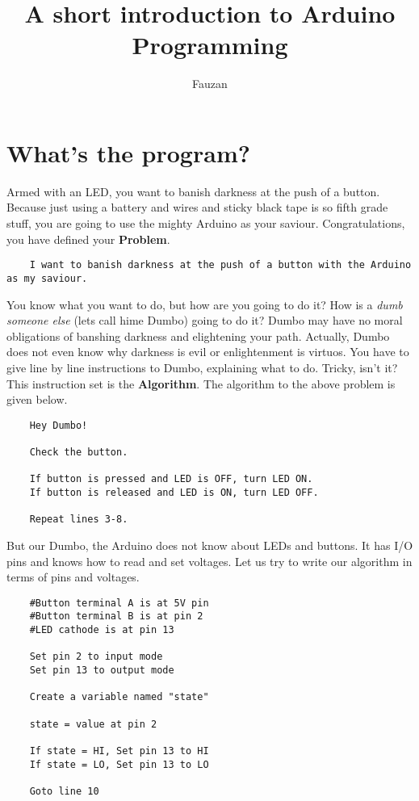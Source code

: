 \documentclass{article}
\begin{document}
\newcommand{\inlncd}[1]{\colorbox{lgray}{\texttt{#1}}}




\title{A short introduction to Arduino Programming}
\author{Fauzan}
\maketitle

\section{What's the program?}
	Armed with an LED, you want to banish darkness at the push of a button\@. Because just using a battery and wires and sticky black tape is so fifth grade stuff, you are going to use the mighty Arduino as your saviour. Congratulations, you have defined your \textbf{Problem}.

	\begin{lstlisting}
	I want to banish darkness at the push of a button with the Arduino as my saviour.
	\end{lstlisting}

	You know what you want to do, but how are you going to do it? How is a \textit{dumb someone else} (lets call hime Dumbo) going to do it? Dumbo may have no moral obligations of banshing darkness and elightening your path. Actually, Dumbo does not even know why darkness is evil or enlightenment is virtuos. You have to give line by line instructions to Dumbo, explaining what to do. Tricky, isn't it? This instruction set is the \textbf{Algorithm}. The algorithm to the above problem is given below.

	\begin{lstlisting}
	Hey Dumbo!

	Check the button.

	If button is pressed and LED is OFF, turn LED ON.
	If button is released and LED is ON, turn LED OFF.

	Repeat lines 3-8.
	\end{lstlisting}

	But our Dumbo, the Arduino does not know about LEDs and buttons. It has I/O pins and knows how to read and set voltages. Let us try to write our algorithm in terms of pins and voltages.

	\begin{lstlisting}
	#Button terminal A is at 5V pin
	#Button terminal B is at pin 2
	#LED cathode is at pin 13

	Set pin 2 to input mode
	Set pin 13 to output mode

	Create a variable named "state"

	state = value at pin 2

	If state = HI, Set pin 13 to HI
	If state = LO, Set pin 13 to LO

	Goto line 10
	\end{lstlisting}
\end{document}
